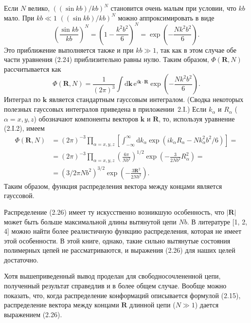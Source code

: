 \documentclass[12pt,a4paper]{article}
\begin{document}
Если $N$ велико, $((\sin kb)/kb)^N$ становится очень малым при условии, что $kb$ мало. При $kb \ll 1$ $((\sin kb)/kb)^N$ можно аппроксимировать в виде
\begin{equation}
\left(\frac{\sin kb}{kb}\right)^N = \left(1 - \frac{k^2 b^2}{6}\right)^N = \exp\left(-\frac{Nk^2 b^2}{6}\right). \tag{2.24}
\end{equation}
Это приближение выполняется также и при $kb \gg 1$, так как в этом случае обе части уравнения (2.24) приблизительно равны нулю. Таким образом, $\Phi(\boldsymbol{R}, N)$ рассчитывается как
\begin{equation}
\Phi(\boldsymbol{R}, N) = \frac{1}{(2\pi)^3}\int\!\mathrm{d}\boldsymbol{k}\,\mathrm{e}^{i\boldsymbol{k}\cdot\boldsymbol{R}}\exp\left(-\frac{Nk^2 b^2}{6}\right). \tag{2.25}
\end{equation}
Интеграл по $\boldsymbol{k}$ является стандартным гауссовым интегралом. (Сводка некоторых полезных гауссовых интегралов приведена в приложении~2.I.) Если $k_\alpha$ и $R_\alpha$ ($\alpha = x, y, z$) обозначают компоненты векторов $\boldsymbol{k}$ и $\boldsymbol{R}$, то, используя уравнение (2.I.2), имеем
\begin{align}
\Phi(\boldsymbol{R}, N) &= (2\pi)^{-3}\prod_{\alpha=x,y,z}\left[\int_{-\infty}^\infty\!\mathrm{d}k_\alpha\exp(ik_\alpha R_\alpha - Nk_\alpha^2 b^2/6)\right] = \nonumber\\
&= (2\pi)^{-3}\prod_{\alpha=x,y,z}\left(\frac{6\pi}{Nb^2}\right)^{1/2}\exp\left(-\frac{3}{2Nb^2}R_\alpha^2\right) = \nonumber\\
&= (3/2\pi Nb^2)^{3/2}\exp\left(-\frac{3\boldsymbol{R}^2}{2Nb^2}\right). \tag{2.26}
\end{align}
Таким образом, функция распределения вектора между концами является гауссовой.

Распределение (2.26) имеет ту искусственно возникшую особенность, что $|\boldsymbol{R}|$ может быть больше максимальной длины вытянутой цепи $Nb$. В литературе [1, 2, 4] можно найти более реалистичную функцию распределения, которая не имеет этой особенности. В этой книге, однако, такие сильно вытянутые состояния полимерных цепей не рассматриваются, и выражения (2.26) для наших целей достаточно.

Хотя вышеприведенный вывод проделан для свободносочлененной цепи, полученный результат справедлив и в более общем случае. Вообще можно показать, что, когда распределение конформаций описывается формулой (2.15), распределение вектора между концами $\boldsymbol{R}$ длинной цепи ($N \gg 1$) дается выражением (2.26).
\end{document}

